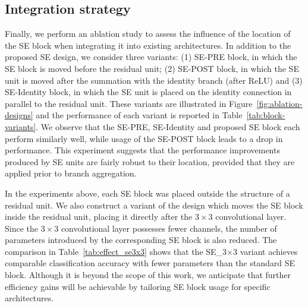 \subsection{Integration strategy} \label{sec:integration}



Finally, we perform an ablation study to assess the influence of the location of the SE block when integrating it into existing architectures.  In addition to the proposed SE design, we consider three variants: (1) SE-PRE block, in which the SE block is moved before the residual unit; (2) SE-POST block, in which the SE unit is moved after the summation with the identity branch (after ReLU) and (3) SE-Identity block, in which the SE unit is placed on the identity connection in parallel to the residual unit.  These variants are illustrated in Figure~\ref{fig:ablation-designs} and the performance of each variant is reported in Table~\ref{tab:block-variants}.  We observe that the \mbox{SE-PRE}, \mbox{SE-Identity} and proposed SE block each perform similarly well, while usage of the \mbox{SE-POST} block leads to a drop in performance.  This experiment suggests that the performance improvements produced by SE units are fairly robust to their location, provided that they are applied prior to branch aggregation.



In the experiments above, each SE block was placed outside the structure of a residual unit. We also construct a variant of the design which moves the SE block inside the residual unit, placing it directly after the $3\times3$ convolutional layer. Since the $3\times3$ convolutional layer possesses fewer channels, the number of parameters introduced by the corresponding SE block is also reduced. The comparison in Table~\ref{tab:effect_se3x3} shows that the SE\_3$\times$3 variant achieves comparable classification accuracy with fewer parameters than the standard SE block.  Although it is beyond the scope of this work, we anticipate that further efficiency gains will be achievable by tailoring SE block usage for specific architectures.